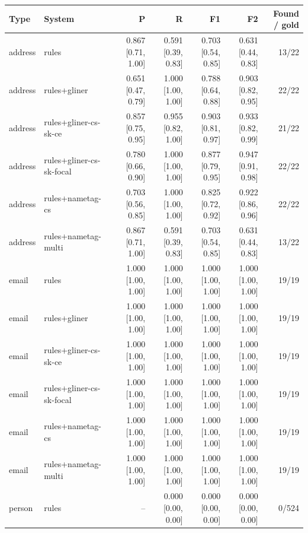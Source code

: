 \providecommand{\ci}[2]{{\scriptsize [#1, #2]}}

\begin{table}[htbp]
\centering
\small
\begin{tabular}{llrrrrr}
\toprule
Type & System & P & R & F1 & F2 & Found / gold \\
\midrule
address & rules & 0.867 \ci{0.71}{1.00} & 0.591 \ci{0.39}{0.83} & 0.703 \ci{0.54}{0.85} & 0.631 \ci{0.44}{0.83} & 13/22 \\
address & rules+gliner & 0.651 \ci{0.47}{0.79} & 1.000 \ci{1.00}{1.00} & 0.788 \ci{0.64}{0.88} & 0.903 \ci{0.82}{0.95} & 22/22 \\
address & rules+gliner-cs-sk-ce & 0.857 \ci{0.75}{0.95} & 0.955 \ci{0.82}{1.00} & 0.903 \ci{0.81}{0.97} & 0.933 \ci{0.82}{0.99} & 21/22 \\
address & rules+gliner-cs-sk-focal & 0.780 \ci{0.66}{0.90} & 1.000 \ci{1.00}{1.00} & 0.877 \ci{0.79}{0.95} & 0.947 \ci{0.91}{0.98} & 22/22 \\
address & rules+nametag-cs & 0.703 \ci{0.56}{0.85} & 1.000 \ci{1.00}{1.00} & 0.825 \ci{0.72}{0.92} & 0.922 \ci{0.86}{0.96} & 22/22 \\
address & rules+nametag-multi & 0.867 \ci{0.71}{1.00} & 0.591 \ci{0.39}{0.83} & 0.703 \ci{0.54}{0.85} & 0.631 \ci{0.44}{0.83} & 13/22 \\
email & rules & 1.000 \ci{1.00}{1.00} & 1.000 \ci{1.00}{1.00} & 1.000 \ci{1.00}{1.00} & 1.000 \ci{1.00}{1.00} & 19/19 \\
email & rules+gliner & 1.000 \ci{1.00}{1.00} & 1.000 \ci{1.00}{1.00} & 1.000 \ci{1.00}{1.00} & 1.000 \ci{1.00}{1.00} & 19/19 \\
email & rules+gliner-cs-sk-ce & 1.000 \ci{1.00}{1.00} & 1.000 \ci{1.00}{1.00} & 1.000 \ci{1.00}{1.00} & 1.000 \ci{1.00}{1.00} & 19/19 \\
email & rules+gliner-cs-sk-focal & 1.000 \ci{1.00}{1.00} & 1.000 \ci{1.00}{1.00} & 1.000 \ci{1.00}{1.00} & 1.000 \ci{1.00}{1.00} & 19/19 \\
email & rules+nametag-cs & 1.000 \ci{1.00}{1.00} & 1.000 \ci{1.00}{1.00} & 1.000 \ci{1.00}{1.00} & 1.000 \ci{1.00}{1.00} & 19/19 \\
email & rules+nametag-multi & 1.000 \ci{1.00}{1.00} & 1.000 \ci{1.00}{1.00} & 1.000 \ci{1.00}{1.00} & 1.000 \ci{1.00}{1.00} & 19/19 \\
person & rules & -- & 0.000 \ci{0.00}{0.00} & 0.000 \ci{0.00}{0.00} & 0.000 \ci{0.00}{0.00} & 0/524 \\

\end{tabular}
\end{table}
